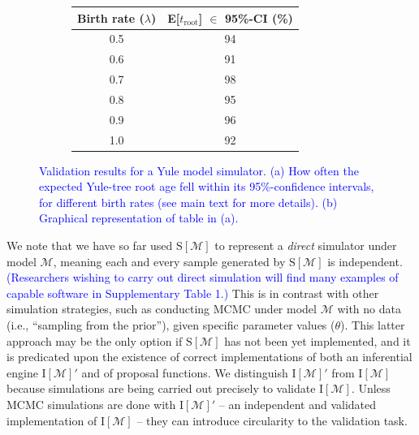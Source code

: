 \documentclass[oneside]{article}
\begin{document}
\begin{figure}
  \centering
  \vspace{0pt}
  \begin{subfigure}[t]{0.4\textwidth}
    \caption{}
    \centering
    \begin{tabular}{ cc }
    \hline
    Birth rate ($\lambda$) & E[$t_{\text{root}}$] $\in$ 95\%-CI (\%)\\
    \hline  
    \rowcolor{gray!10}0.5 & 94\\
    0.6 & 91\\
    \rowcolor{gray!10}0.7 & 98\\
    0.8 & 95\\
    \rowcolor{gray!10}0.9 & 96\\
    1.0 & 92
  \end{tabular}
  \end{subfigure}
  \vspace{0pt}
  \hspace{1cm}
  \begin{subfigure}[t]{0.4\textwidth}
    \caption{}
    \centering
    
  \end{subfigure}
  \caption{\textcolor{blue}{Validation results for a Yule model simulator. (a) How often the expected Yule-tree root age fell within its 95\%-confidence intervals, for different birth rates (see main text for more details). (b) Graphical representation of table in (a).}}
  \label{fig:yulemean}
\end{figure}

We note that we have so far used $\text{S}[\mathcal{M}]$ to represent a \emph{direct} simulator under model $\mathcal{M}$, meaning each and every sample generated by $\text{S}[\mathcal{M}]$ is independent.
\textcolor{blue}{(Researchers wishing to carry out direct simulation will find many examples of capable software in Supplementary Table 1.)}
This is in contrast with other simulation strategies, such as conducting MCMC under model $\mathcal{M}$ with no data (i.e., ``sampling from the prior''), given specific parameter values ($\theta$).
This latter approach may be the only option if $\text{S}[\mathcal{M}]$ has not been yet implemented, and it is predicated upon the existence of correct implementations of both an inferential engine $\text{I}[\mathcal{M}]'$ and of proposal functions.
We distinguish $\text{I}[\mathcal{M}]'$ from $\text{I}[\mathcal{M}]$ because simulations are being carried out precisely to validate $\text{I}[\mathcal{M}]$.
Unless MCMC simulations are done with $\text{I}[\mathcal{M}]'$ -- an independent and validated implementation of $\text{I}[\mathcal{M}]$ -- they can introduce circularity to the validation task.
\end{document}
